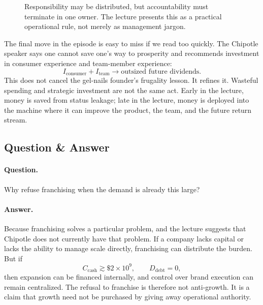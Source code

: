 \begin{figure}
\centering
{}
\caption{Responsibility may be distributed, but accountability must terminate in one owner. The lecture presents this as a practical operational rule, not merely as management jargon.}
\end{figure}

The final move in the episode is easy to miss if we read too quickly. The Chipotle speaker says one cannot save one's way to prosperity and recommends investment in consumer experience and team-member experience:
\begin{equation}
I_{\mathrm{consumer}} + I_{\mathrm{team}} \longrightarrow \text{outsized future dividends}.
\end{equation}
This does not cancel the gel-nails founder's frugality lesson. It refines it. Wasteful spending and strategic investment are not the same act. Early in the lecture, money is saved from status leakage; late in the lecture, money is deployed into the machine where it can improve the product, the team, and the future return stream.

\subsection{Question \& Answer}

\paragraph{Question.} Why refuse franchising when the demand is already this large?

\paragraph{Answer.} Because franchising solves a particular problem, and the lecture suggests that Chipotle does not currently have that problem. If a company lacks capital or lacks the ability to manage scale directly, franchising can distribute the burden. But if
\[
C_{\mathrm{cash}}\gtrsim \$2\times 10^9, \qquad D_{\mathrm{debt}}=0,
\]
then expansion can be financed internally, and control over brand execution can remain centralized. The refusal to franchise is therefore not anti-growth. It is a claim that growth need not be purchased by giving away operational authority.

